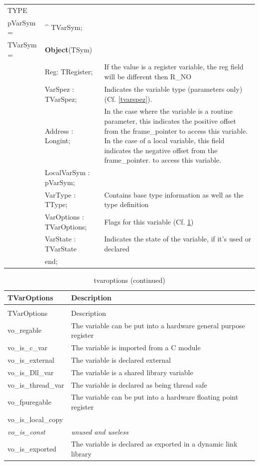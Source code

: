 \documentclass [a4paper,12pt]{article}
\begin{document}
\begin{tabular*}{6.5in}{|l@{\extracolsep{\fill}}lp{8.5cm}|}
\hline
\textsf{TYPE}& & \\
\xspace pVarSym = & \^{}  TVarSym; & \\
\xspace \textsf{TVarSym} = & \textbf{Object}(TSym) & \\
& \textsf{Reg: TRegister;}&
    If the value is a register variable, the \textsf{reg} field will be
    different then R{\_}NO \\
& \textsf{VarSpez : TVarSpez;}&
    Indicates the variable type (parameters only) (Cf. \ref{tvarspez}). \\
& \textsf{Address : Longint;}&
    In the case where the variable is a routine parameter, this
    indicates the positive offset from the \textsf{frame{\_}pointer }to
    access this variable. In the case of a local variable, this field
    indicates the negative offset from the \textsf{frame{\_}pointer}. to
    access this variable. \\
& \textsf{LocalVarSym : pVarSym;}&  \\
& \textsf{VarType : TType;}&
    Contains base type information as well as the type definition \\
& \textsf{VarOptions : TVarOptions;}&
    Flags for this variable (Cf. \ref{tvaroptions}) \\
& \textsf{VarState : TVarState}&
    Indicates the state of the variable, if it's used or declared \\
& \textsf{end;}&  \\
\hline
\end{tabular*}

\begin{longtable}{|l|p{10cm}|}
\caption{tvaroptions}\label{tvaroptions}\\
\hline
TVarOptions & Description \\
\hline
\endfirsthead
\caption{tvaroptions (continued)}\\
\hline
TVarOptions & Description \\
\hline
\endhead
\hline
\endfoot
\textsf{vo{\_}regable}&
    The variable can be put into a hardware general purpose register \\
\textsf{vo{\_}is{\_}c{\_}var}&
    The variable is imported from a C module \\
\textsf{vo{\_}is{\_}external}&
    The variable is declared external \\
\textsf{vo{\_}is{\_}Dll{\_}var}&
    The variable is a shared library variable \\
\textsf{vo{\_}is{\_}thread{\_}var}&
    The variable is declared as being thread safe \\
\textsf{vo{\_}fpuregable}&
    The variable can be put into a hardware floating point register \\
\textsf{vo{\_}is{\_}local{\_}copy}&  \\
\textsf{\textit{vo{\_}is{\_}const}}&
    \textit{unused and useless} \\
\textsf{vo{\_}is{\_}exported}&
    The variable is declared as exported in a dynamic link library 
\end{longtable}
\end{document}
